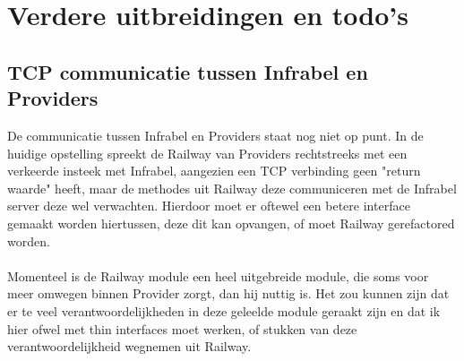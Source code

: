 \documentclass[a4paper, 11pt]{article}
\newcommand{\naar}{\,$\rightarrow$\,}
\renewcommand{\empty}{$\varnothing$}
\newcommand{\<}{\scriptsize\textless\normalsize}
\renewcommand{\>}{\scriptsize\textgreater\normalsize}
\begin{document}

\newpage
\section{Verdere uitbreidingen en todo's} %
\subsection{TCP communicatie tussen Infrabel en Providers}
De communicatie tussen Infrabel en Providers staat nog niet op punt. In de huidige opstelling spreekt de Railway van Providers rechtstreeks met een verkeerde insteek met Infrabel, aangezien een TCP verbinding geen "return waarde" heeft, maar de methodes uit Railway deze communiceren met de Infrabel server deze wel verwachten. Hierdoor moet er oftewel een betere interface gemaakt worden hiertussen, deze dit kan opvangen, of moet Railway gerefactored worden.\\\\
Momenteel is de Railway module een heel uitgebreide module, die soms voor meer omwegen binnen Provider zorgt, dan hij nuttig is. Het zou kunnen zijn dat er te veel verantwoordelijkheden in deze geleelde module geraakt zijn en dat ik hier ofwel met thin interfaces moet werken, of stukken van deze verantwoordelijkheid wegnemen uit Railway.
\end{document}
